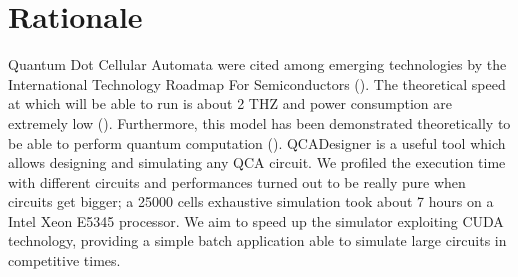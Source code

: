 \chapter{Rationale}\label{sec:rationale}
Quantum Dot Cellular Automata were cited among emerging technologies by the International Technology Roadmap For Semiconductors (\cite{art:ITRS_ERD}). The theoretical speed at which will be able to run is about 2 THZ and power consumption are extremely low (\cite{art:FPGA_Quantum}). Furthermore, this model has been demonstrated theoretically to be able to perform quantum computation (\cite{art:Quantum_QCA}).
QCADesigner is a useful tool which allows designing and simulating any QCA circuit. We profiled the execution time with different circuits and performances turned out to be really pure when circuits get bigger; a 25000 cells exhaustive simulation took about 7 hours on a Intel Xeon E5345 processor.\newline
We aim to speed up the simulator exploiting CUDA technology, providing a simple batch application able to simulate large circuits in competitive times.